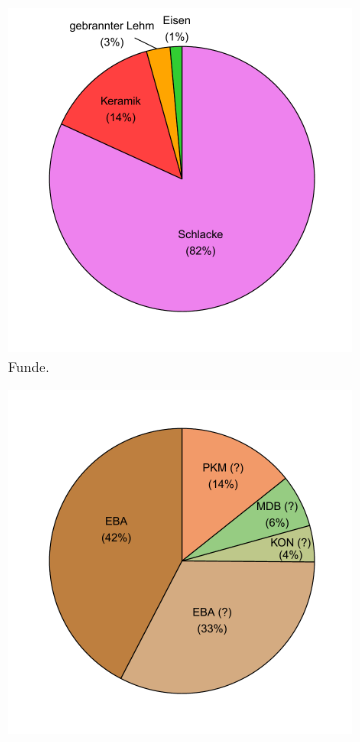 \begin{figure}[!tb]
	\centering
	\begin{subfigure}[t]{0.32\textwidth}
		\centering
		\includegraphics[width = \textwidth]{fig/9-10_PIK87-3_Funde_R_modDS.pdf}
		\caption{Funde.}
		\label{fig:PIK87-3_FundeArt}
	\end{subfigure}
	\begin{subfigure}[t]{0.32\textwidth}
		\centering
		\includegraphics[width = \textwidth]{fig/9-10_PIK87-3_Stilgruppen_R_modDS.pdf}

\end{subfigure}
\end{figure}
